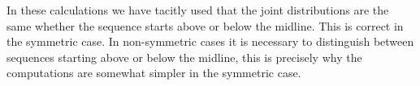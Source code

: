 In these calculations we have tacitly used that the joint distributions are the same whether the sequence starts above or below the midline. This is correct in the symmetric case. In non-symmetric cases it is necessary to distinguish between sequences starting above or below the midline, this is precisely why the computations are somewhat simpler in the symmetric case.






\address{Tore Wentzel-Larsen\\
  Centre for Child and Adolescent Mental Health, Eastern and Southern Norway\\
  Norwegian Centre of Violence and Traumatic Stress Studies \\
  Norway\\
  }

\address{Jacob Anh{\o}j\\
  Rigshospitalet, University of Copenhagen\\
  Denmark\\
  (ORCiD  https://orcid.org/0000-0002-7701-1774)\\
  }


